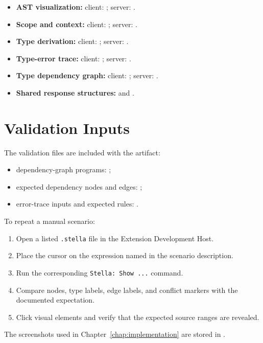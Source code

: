 \begin{itemize}
    \item \textbf{AST visualization:}
    client: ;
    server: .

    \item \textbf{Scope and context:}
    client: ;
    server: .

    \item \textbf{Type derivation:}
    client: ;
    server: .

    \item \textbf{Type-error trace:}
    client: ;
    server: .

    \item \textbf{Type dependency graph:}
    client: ;
    server: .

    \item \textbf{Shared response structures:}
     and .
\end{itemize}

\section{Validation Inputs}

The validation files are included with the artifact:

\begin{itemize}
    \item dependency-graph programs: ;
    \item expected dependency nodes and edges: ;
    \item error-trace inputs and expected rules: .
\end{itemize}

To repeat a manual scenario:

\begin{enumerate}
    \item Open a listed \texttt{.stella} file in the Extension Development Host.
    \item Place the cursor on the expression named in the scenario description.
    \item Run the corresponding \texttt{Stella: Show ...} command.
    \item Compare nodes, type labels, edge labels, and conflict markers with the documented expectation.
    \item Click visual elements and verify that the expected source ranges are revealed.
\end{enumerate}

The screenshots used in Chapter~\ref{chap:implementation} are stored in
.

